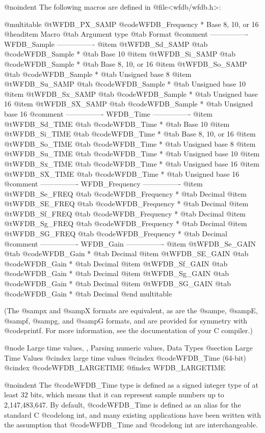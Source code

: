 {{{{{{{{{{{{{{@noindent
The following macros are defined in @file{<wfdb/wfdb.h>}:

@multitable {@t{WFDB_PX_SAMP}} {@code{WFDB_Frequency *}} {Base 8, 10, or 16}
@headitem Macro
@tab Argument type
@tab Format
@comment ---------------- WFDB_Sample ----------------
@item @t{WFDB_Sd_SAMP} @tab @code{WFDB_Sample *} @tab Base 10
@item @t{WFDB_Si_SAMP} @tab @code{WFDB_Sample *} @tab Base 8, 10, or 16
@item @t{WFDB_So_SAMP} @tab @code{WFDB_Sample *} @tab Unsigned base 8
@item @t{WFDB_Su_SAMP} @tab @code{WFDB_Sample *} @tab Unsigned base 10
@item @t{WFDB_Sx_SAMP} @tab @code{WFDB_Sample *} @tab Unsigned base 16
@item @t{WFDB_SX_SAMP} @tab @code{WFDB_Sample *} @tab Unsigned base 16
@comment ---------------- WFDB_Time ----------------
@item @t{WFDB_Sd_TIME} @tab @code{WFDB_Time *} @tab Base 10
@item @t{WFDB_Si_TIME} @tab @code{WFDB_Time *} @tab Base 8, 10, or 16
@item @t{WFDB_So_TIME} @tab @code{WFDB_Time *} @tab Unsigned base 8
@item @t{WFDB_Su_TIME} @tab @code{WFDB_Time *} @tab Unsigned base 10
@item @t{WFDB_Sx_TIME} @tab @code{WFDB_Time *} @tab Unsigned base 16
@item @t{WFDB_SX_TIME} @tab @code{WFDB_Time *} @tab Unsigned base 16
@comment ---------------- WFDB_Frequency ----------------
@item @t{WFDB_Se_FREQ} @tab @code{WFDB_Frequency *} @tab Decimal
@item @t{WFDB_SE_FREQ} @tab @code{WFDB_Frequency *} @tab Decimal
@item @t{WFDB_Sf_FREQ} @tab @code{WFDB_Frequency *} @tab Decimal
@item @t{WFDB_Sg_FREQ} @tab @code{WFDB_Frequency *} @tab Decimal
@item @t{WFDB_SG_FREQ} @tab @code{WFDB_Frequency *} @tab Decimal
@comment ---------------- WFDB_Gain ----------------
@item @t{WFDB_Se_GAIN} @tab @code{WFDB_Gain *} @tab Decimal
@item @t{WFDB_SE_GAIN} @tab @code{WFDB_Gain *} @tab Decimal
@item @t{WFDB_Sf_GAIN} @tab @code{WFDB_Gain *} @tab Decimal
@item @t{WFDB_Sg_GAIN} @tab @code{WFDB_Gain *} @tab Decimal
@item @t{WFDB_SG_GAIN} @tab @code{WFDB_Gain *} @tab Decimal
@end multitable

(The @samp{x} and @samp{X} formats are equivalent, as are the @samp{e},
@samp{E}, @samp{f}, @samp{g}, and @samp{G} formats, and are provided for
symmetry with @code{printf}.  For more information, see the documentation of
your C compiler.)

@node Large time values, , Parsing numeric values, Data Types
@section Large Time Values
@cindex large time values
@cindex @code{WFDB_Time} (64-bit)
@cindex @code{WFDB_LARGETIME}
@findex WFDB_LARGETIME

@noindent
The @code{WFDB_Time} type is defined as a signed integer type of at least 32
bits, which means that it can represent sample numbers up to 2,147,483,647.  By
default, @code{WFDB_Time} is defined as an alias for the standard C
@code{long int}, and many existing applications have been written with the
assumption that @code{WFDB_Time} and @code{long int} are interchangeable.

}}}}}}}}}}}}}}
